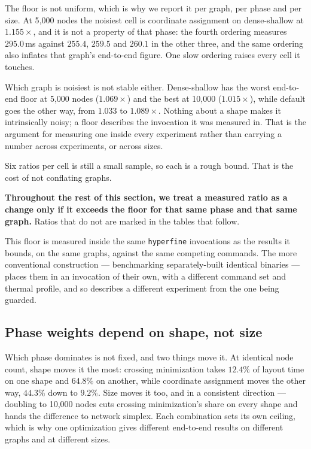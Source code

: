 The floor is not uniform, which is why we report it per graph, per phase and per
size. At 5{,}000 nodes the noisiest cell is coordinate assignment on
dense-shallow at $1.155\times$, and it is not a property of that phase: the
fourth ordering measures $295.0$\,ms against $255.4$, $259.5$ and $260.1$ in the
other three, and the same ordering also inflates that graph's end-to-end figure.
One slow ordering raises every cell it touches.

Which graph is noisiest is not stable either. Dense-shallow has the worst
end-to-end floor at 5{,}000 nodes ($1.069\times$) and the best at 10{,}000
($1.015\times$), while default goes the other way, from $1.033$ to
$1.089\times$. Nothing about a shape makes it intrinsically noisy; a floor
describes the invocation it was measured in. That is the argument for measuring
one inside every experiment rather than carrying a number across experiments, or
across sizes.

Six ratios per cell is still a small sample, so each is a rough bound. That is
the cost of not conflating graphs.

\textbf{Throughout the rest of this section, we treat a measured ratio as a
change only if it exceeds the floor for that same phase and that same graph.}
Ratios that do not are marked in the tables that follow.

This floor is measured inside the same \texttt{hyperfine} invocations as the
results it bounds, on the same graphs, against the same competing commands. The
more conventional construction --- benchmarking separately-built identical
binaries --- places them in an invocation of their own, with a different command
set and thermal profile, and so describes a different experiment from the one
being guarded.

\subsection{Phase weights depend on shape, not size}
\label{sec:shape}

Which phase dominates is not fixed, and two things move it. At identical node
count, shape moves it the most: crossing minimization takes $12.4\%$ of layout
time on one shape and $64.8\%$ on another, while coordinate assignment moves the
other way, $44.3\%$ down to $9.2\%$. Size moves it too, and in a consistent
direction --- doubling to 10{,}000 nodes cuts crossing minimization's share on
every shape and hands the difference to network simplex. Each combination sets
its own ceiling, which is why one optimization gives different end-to-end
results on different graphs and at different sizes.

